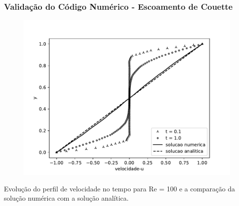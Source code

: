 \begin{frame} 
 \frametitle{\small Validação do Código Numérico - Escoamento de Couette}
\begin{figure}
  \centering
  \vspace{-1.5cm}
  \includegraphics[scale=0.6]{images/couette_velocity.pdf}
\end{figure}
\vspace{-0.2cm}
\centering \scriptsize Evolução do perfil de velocidade no tempo para Re = 100 e a comparação da
solução numérica com a solução analítica.
\end{frame}


